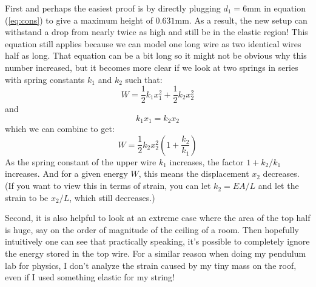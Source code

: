 \documentclass{article}
\begin{document}
First and perhaps the easiest proof is by directly plugging $d_1=6\si{\milli\meter}$ in equation (\ref{eq:cons}) to give a maximum height of $0.631\si{\milli\meter}$. As a result, the new setup can withstand a drop from nearly twice as high and still be in the elastic region! This equation still applies because we can model one long wire as two identical wires half as long. That equation can be a bit long so it might not be obvious why this number increased, but it becomes more clear if we look at two springs in series with spring constants $k_1$ and $k_2$ such that:
\begin{equation}
    W=\frac{1}{2}k_1x_1^2+\frac{1}{2}k_2x_2^2
    \label{eq:}
\end{equation}
and
\begin{equation}
    k_1x_1=k_2x_2
    \label{eq:}
\end{equation}
which we can combine to get:
\begin{equation}
    W = \frac{1}{2}k_2x_2^2\left(1+\frac{k_2}{k_1}\right)
    \label{eq:}
\end{equation}
As the spring constant of the upper wire $k_1$ increases, the factor $1+k_2/k_1$ increases. And for a given energy $W$, this means the displacement $x_2$ decreases. (If you want to view this in terms of strain, you can let $k_2=EA/L$ and let the strain to be $x_2/L$, which still decreases.)
\vspace{2mm}

Second, it is also helpful to look at an extreme case where the area of the top half is huge, say on the order of magnitude of the ceiling of a room. Then hopefully intuitively one can see that practically speaking, it's possible to completely ignore the energy stored in the top wire. For a similar reason when doing my pendulum lab for physics, I don't analyze the strain caused by my tiny mass on the roof, even if I used something elastic for my string!
\vspace{2mm}
\end{document}
